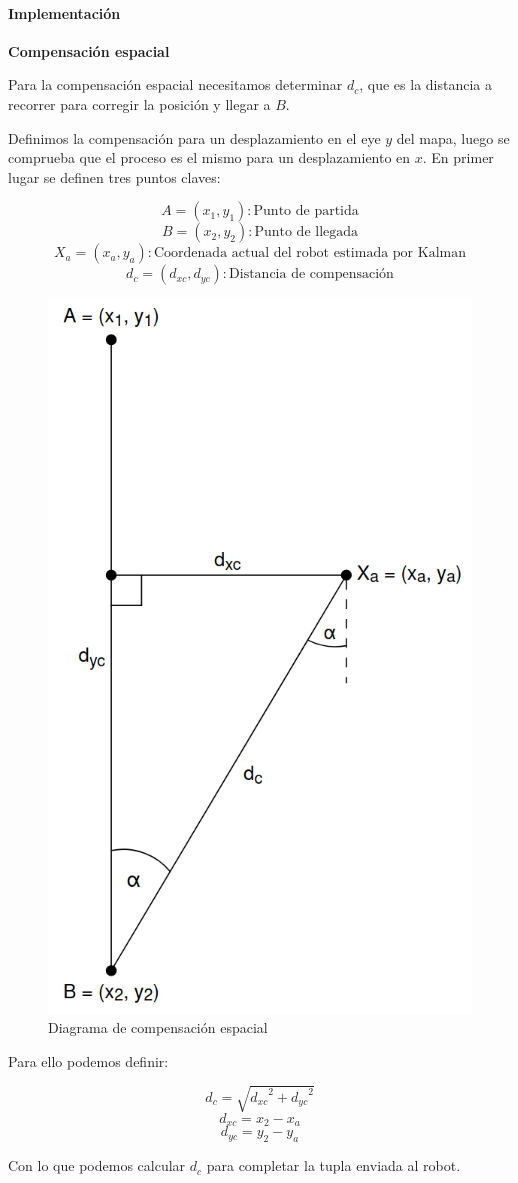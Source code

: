 \paragraph{Implementación} \mbox{} \vspace{10pt}

\textbf{Compensación espacial} \mbox{} \vspace{10pt}

Para la compensación espacial necesitamos determinar $d_c$, que es la distancia a recorrer para corregir la posición y llegar a $B$.

Definimos la compensación para un desplazamiento en el eye $y$ del mapa, luego se comprueba que el proceso es el mismo para un desplazamiento en $x$. En primer lugar se definen tres puntos claves:

$$ A = (x_1, y_1) : \text{Punto de partida} $$
$$ B = (x_2, y_2) : \text{Punto de llegada} $$
$$ X_a = (x_a, y_a) : \text{Coordenada actual del robot estimada por Kalman} $$
$$ d_c = (d_{xc}, d_{yc}) : \text{Distancia de compensación} $$

\begin{figure}[H]
    \centering
    \includegraphics[width=0.4\linewidth]{images/compensacion_vector_distancia_kalman.png}
    \caption{Diagrama de compensación espacial}
    \label{fig:diagcompespacial}
\end{figure}

Para ello podemos definir:

$$ d_c = \sqrt{ {d_{xc}}^2 + {d_{yc}}^2 } $$
$$ d_{xc} = x_2 - x_a $$
$$ d_{yc} = y_2 - y_a $$

Con lo que podemos calcular $d_c$ para completar la tupla enviada al robot.

